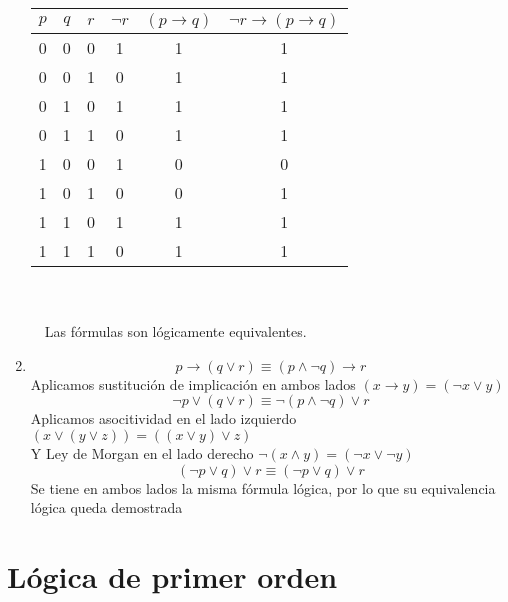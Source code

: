 \documentclass[11pt]{utalcaDoc}
\begin{document}
\begin{enumerate}
\begin{tabular}{|c|c|c||c|c|c|}
\hline 
$p$ & $q$ & $r$ & $\neg r$ & $(p \to q)$ & $\neg r \to (p \to q)$ \\
\hline 
0 & 0 & 0 & 1 & 1 & 1 \\ 
\hline 
0 & 0 & 1 & 0 & 1 & 1 \\ 
\hline 
0 & 1 & 0 & 1 & 1 & 1 \\ 
\hline 
0 & 1 & 1 & 0 & 1 & 1 \\ 
\hline 
1 & 0 & 0 & 1 & 0 & 0 \\ 
\hline 
1 & 0 & 1 & 0 & 0 & 1 \\ 
\hline 
1 & 1 & 0 & 1 & 1 & 1 \\ 
\hline 
1 & 1 & 1 & 0 & 1 & 1 \\ 
\hline 
\end{tabular}
\\ \\ \ \
Las fórmulas son lógicamente equivalentes.

\newpage
\item

\[ p \to (q \lor r) \equiv (p \wedge \neg q) \to r \]
Aplicamos sustitución de implicación en ambos lados $(x \to y) = (\neg x \lor y)$
\[ \neg p \lor (q \lor r) \equiv \neg (p \wedge \neg q) \lor r \]
Aplicamos asocitividad en el lado izquierdo $(x \lor (y \lor z)) = ((x \lor y) \lor z)$ \\
Y Ley de Morgan en el lado derecho $\neg(x \wedge y) = (\neg x \lor \neg y)$
\[ (\neg p \lor q) \lor r \equiv (\neg p \lor q) \lor r \]
Se tiene en ambos lados la misma fórmula lógica, por lo que su equivalencia lógica queda demostrada
\end{enumerate}
\newpage
\section{Lógica de primer orden}


\subsection{ } %
\end{document}
